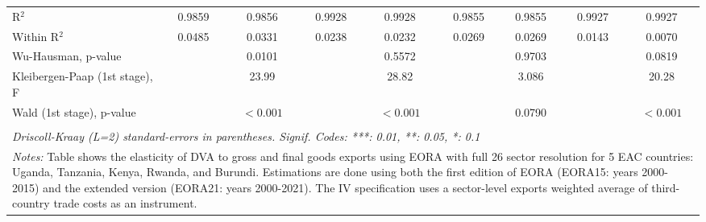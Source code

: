 \documentclass[a4paper]{article}
\begin{document}
\begin{table}[h!]
{\begin{tabular}{lcccccccc}
      R$^2$                               & 0.9859         & 0.9856                & 0.9928         & 0.9928                & 0.9855         & 0.9855        & 0.9927         & 0.9927\\  
      Within R$^2$                        & 0.0485         & 0.0331                & 0.0238         & 0.0232                & 0.0269         & 0.0269        & 0.0143         & 0.0070\\  
      Wu-Hausman, p-value                 &                & 0.0101                &                & 0.5572                &                & 0.9703        &                & 0.0819\\  
      Kleibergen-Paap (1st stage), F &           & 23.99                 &                & 28.82                 &                & 3.086         &                & 20.28\\  
      Wald (1st stage), p-value   &                & $<0.001$              &                & $<0.001$              &                & 0.0790               &   & $<0.001$             \\  
      \bottomrule \\ [-0.9em]
      \multicolumn{9}{l}{\emph{Driscoll-Kraay (L=2) standard-errors in parentheses. Signif. Codes: ***: 0.01, **: 0.05, *: 0.1}}\\
      \multicolumn{9}{l}{\parbox{1.25\textwidth}{\scriptsize
\textit{Notes:} Table shows the elasticity of DVA to gross and final goods exports using EORA with full 26 sector resolution for 5 EAC countries: Uganda, Tanzania, Kenya, Rwanda, and Burundi. Estimations are done using both the first edition of EORA (EORA15: years 2000-2015) and the extended version (EORA21: years 2000-2021). The IV specification uses a sector-level exports weighted average of third-country trade costs as an instrument.  }}
   \end{tabular}
   }
\end{table}
\FloatBarrier
\end{document}
